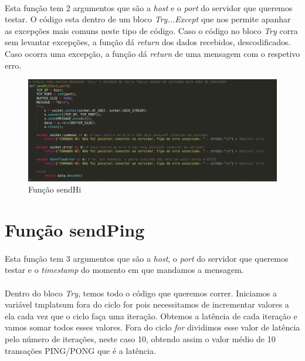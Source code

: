 \documentclass{report}
\begin{document}
\paragraph{}
Esta função tem 2 argumentos que são a \textit{host} e o \textit{port} do servidor que queremos testar.
O código esta dentro de um bloco \textit{Try...Except} que nos permite apanhar as excepções mais comuns neste tipo de código. \newline
Caso o código no bloco \textit{Try} corra sem levantar excepções, a função dá \textit{return} dos dados recebidos, descodificados.
Caso ocorra uma excepção, a função dá \textit{return} de uma mensagem com o respetivo erro.

\begin{figure}[H]
\centering
\includegraphics[width=0.9\linewidth]{sendHi.png}
\caption{Função sendHi}
\label{getIDHost}
\end{figure}


\section{Função sendPing }
\label{sec:sendPing}
\paragraph{}
Esta função tem 3 argumentos que são a \textit{host}, o \textit{port} do servidor que queremos testar e o \textit{timestamp} do momento em que mandamos a mensagem.
\paragraph{}
Dentro do bloco \textit{Try}, temos todo o código que queremos correr. Iniciamos a variável tmp\textunderscore lat\textunderscore sum fora do ciclo for pois necessitamos de incrementar valores a ela cada vez que o ciclo faça uma iteração. Obtemos a latência de cada iteração e vamos somar todos esses valores. \newline
Fora do ciclo \textit{for} dividimos esse valor de latência pelo número de iterações, neste caso 10, obtendo assim o valor médio de 10 transações PING/PONG que é a latência.
\end{document}
